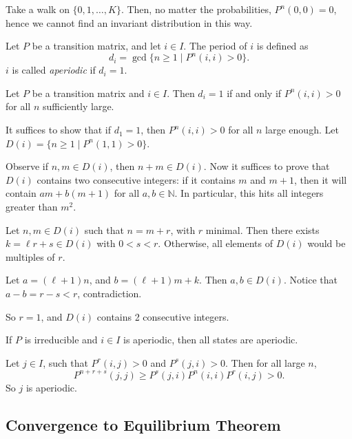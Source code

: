 \documentclass[12pt]{article}
\begin{document}
\begin{exbox}
	Take a walk on $\{0, 1, \ldots, K\}$. Then, no matter the probabilities, $P^{n}(0, 0) = 0$, hence we cannot find an invariant distribution in this way.
\end{exbox}

\begin{definition}
	Let $P$ be a transition matrix, and let $i \in I$. The period of $i$ is defined as
	\[
		d_i = \gcd \{n \geq 1 \mid P^{n}(i, i) > 0\}
	.\]
	$i$ is called \textit{aperiodic} if $d_i = 1$.
\end{definition}

\begin{lemma}
	Let $P$ be a transition matrix and $i \in I$. Then $d_i = 1$ if and only if $P^{n}(i, i) > 0$ for all $n$ sufficiently large.
\end{lemma}

\begin{proofbox}
	It suffices to show that if $d_1 = 1$, then $P^{n}(i, i) > 0$ for all $n$ large enough. Let $D(i) = \{n \geq 1 \mid P^{n}(1, 1) > 0\}$.

	Observe if $n, m \in D(i)$, then $n + m \in D(i)$. Now it suffices to prove that $D(i)$ contains two consecutive integers: if it contains $m$ and $m+1$, then it will contain $am + b(m+1)$ for all $a, b \in \mathbb{N}$. In particular, this hits all integers greater than $m^2$.

	Let $n, m \in D(i)$ such that $n = m + r$, with $r$ minimal. Then there exists $k = \ell r + s \in D(i)$ with $0 < s < r$. Otherwise, all elements of $D(i)$ would be multiples of $r$.

	Let $a = (\ell + 1)n$, and $b = (\ell + 1)m + k$. Then $a, b \in D(i)$. Notice that $a - b = r - s < r$, contradiction.

	So $r = 1$, and $D(i)$ contains 2 consecutive integers.
\end{proofbox}

\begin{lemma}
	If $P$ is irreducible and $i \in I$ is aperiodic, then all states are aperiodic.
\end{lemma}

\begin{proofbox}
	Let $j \in I$, such that $P^{r}(i, j) > 0$ and $P^{s}(j, i) > 0$. Then for all large $n$,
	\[
		P^{n+r+s}(j,j) \geq P^{s}(j, i) P^{n}(i,i) P^{r}(i,j) > 0
	.\]
	So $j$ is aperiodic.
\end{proofbox}

\subsection{Convergence to Equilibrium Theorem}%
\label{sub:convergence_to_equilibrium_theorem}
\end{document}
